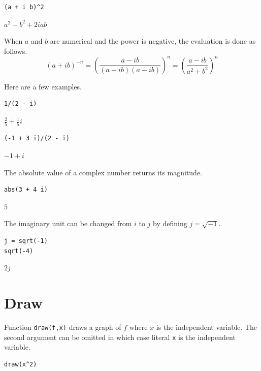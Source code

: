 \documentclass[12pt]{article}
\begin{document}
{\color{blue}
\begin{verbatim}
(a + i b)^2
\end{verbatim}
}

$\displaystyle a^2-b^2+2iab$

\bigskip

When $a$ and $b$ are numerical and the power is negative, the evaluation is done as follows.
\begin{equation*}
(a+ib)^{-n}
=\left(\frac{a-ib}{(a+ib)(a-ib)}\right)^n=
\left(\frac{a-ib}{a^2+b^2}\right)^n
\end{equation*}

Here are a few examples.

{\color{blue}
\begin{verbatim}
1/(2 - i)
\end{verbatim}
}

$\displaystyle \tfrac{2}{5}+\tfrac{1}{5}i$

{\color{blue}
\begin{verbatim}
(-1 + 3 i)/(2 - i)
\end{verbatim}
}

$\displaystyle -1+i$

\bigskip

The absolute value of a complex number returns its magnitude.

{\color{blue}
\begin{verbatim}
abs(3 + 4 i)
\end{verbatim}
}

$\displaystyle 5$

\bigskip

The imaginary unit can be changed from $i$ to $j$
by defining $j=\sqrt{-1}$.

{\color{blue}
\begin{verbatim}
j = sqrt(-1)
sqrt(-4)
\end{verbatim}
}

$\displaystyle 2j$

\newpage

\section{Draw}

Function \verb$draw(f,x)$ draws a graph of $f$ where $x$ is the independent variable.
The second argument can be omitted in which case literal \verb$x$ is the independent variable.

{\color{blue}
\begin{verbatim}
draw(x^2)
\end{verbatim}}
\end{document}
